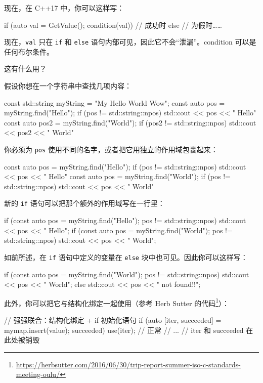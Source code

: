 现在，在 C++17 中，你可以这样写：

\begin{codebox}[cpp]
if (auto val = GetValue(); condition(val))
// 成功时
else
// 为假时……
\end{codebox}

现在，\texttt{val} 只在 \texttt{if} 和 \texttt{else} 语句内部可见，因此它不会“泄漏”。condition 可以是任何布尔条件。

这有什么用？

假设你想在一个字符串中查找几项内容：

\begin{codebox}[cpp]
const std::string myString = "My Hello World Wow";
const auto pos = myString.find("Hello");
if (pos != std::string::npos)
std::cout << pos << " Hello\n"
const auto pos2 = myString.find("World");
if (pos2 != std::string::npos)
std::cout << pos2 << " World\n"
\end{codebox}

你必须为 \texttt{pos} 使用不同的名字，或者把它用独立的作用域包裹起来：

\begin{codebox}[cpp]
{
const auto pos = myString.find("Hello");
if (pos != std::string::npos)
std::cout << pos << " Hello\n"
}
{
const auto pos = myString.find("World");
if (pos != std::string::npos)
std::cout << pos << " World\n"
}
\end{codebox}

新的 \texttt{if} 语句可以把那个额外的作用域写在一行里：

\begin{codebox}[cpp]
if (const auto pos = myString.find("Hello"); pos != std::string::npos)
std::cout << pos << " Hello\n";
if (const auto pos = myString.find("World"); pos != std::string::npos)
std::cout << pos << " World\n";
\end{codebox}

如前所述，在 \texttt{if} 语句中定义的变量在 \texttt{else} 块中也可见。因此你可以这样写：

\begin{codebox}[cpp]
if (const auto pos = myString.find("World"); pos != std::string::npos)
std::cout << pos << " World\n";
else
std::cout << pos << " not found!!\n";
\end{codebox}

此外，你可以把它与结构化绑定一起使用（参考 Herb Sutter 的代码\footnote{\url{https://herbsutter.com/2016/06/30/trip-report-summer-iso-c-standards-meeting-oulu/}}）：

\begin{codebox}[cpp]
// 强强联合：结构化绑定 + if 初始化语句
if (auto [iter, succeeded] = mymap.insert(value); succeeded) {
use(iter);
// 正常
// ...
} // iter 和 succeeded 在此处被销毁
\end{codebox}

